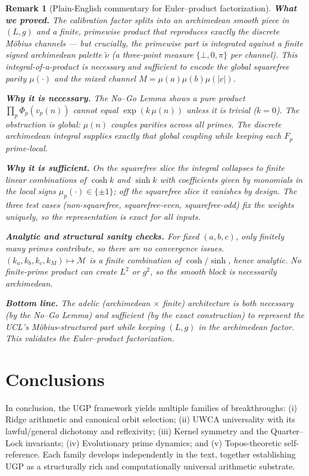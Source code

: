 \documentclass[12pt]{article}
\newtheorem*{remark*}{Remark}
\numberwithin{equation}{section}
\begin{document}
\begin{remark*}[Plain-English commentary for Euler–product factorization]
\textbf{What we proved.}
The calibration factor splits into an \emph{archimedean} smooth piece in $(L,g)$ and a \emph{finite, primewise} product that reproduces exactly the discrete Möbius channels — but crucially, the primewise part is integrated against a \emph{finite signed} archimedean palette $\tilde\nu$ (a three-point measure $\{\bot,0,\pi\}$ per channel). This integral-of-a-product is necessary and sufficient to encode the global squarefree parity $\mu(\cdot)$ and the mixed channel $M=\mu(a)\mu(b)\mu(|c|)$.

\textbf{Why it is necessary.}
The No–Go Lemma shows a pure product $\prod_p \Phi_p(v_p(n))$ cannot equal $\exp(k\,\mu(n))$ unless it is trivial ($k{=}0$). The obstruction is global: $\mu(n)$ couples parities across \emph{all} primes. The discrete archimedean integral supplies exactly that global coupling while keeping each $F_p$ prime-local.

\textbf{Why it is sufficient.}
On the squarefree slice the integral collapses to finite linear combinations of $\cosh k$ and $\sinh k$ with coefficients given by monomials in the local signs $\mu_p(\cdot)\in\{\pm1\}$; off the squarefree slice it vanishes by design. The three test cases (non-squarefree, squarefree-even, squarefree-odd) fix the weights uniquely, so the representation is exact for all inputs.

\textbf{Analytic and structural sanity checks.}
For fixed $(a,b,c)$, only finitely many primes contribute, so there are no convergence issues. $(k_a,k_b,k_c,k_M)\mapsto\mathcal{M}$ is a finite combination of $\cosh/\sinh$, hence analytic. No finite-prime product can create $L^2$ or $g^2$, so the smooth block is necessarily archimedean.

\textbf{Bottom line.}
The adelic (archimedean $\times$ finite) architecture is both \emph{necessary} (by the No–Go Lemma) and \emph{sufficient} (by the exact construction) to represent the UCL's Möbius-structured part while keeping $(L,g)$ in the archimedean factor. This validates the Euler–product factorization.
\end{remark*}


\section{Conclusions}
In conclusion, the UGP framework yields multiple families of breakthroughs: 
(i) Ridge arithmetic and canonical orbit selection; 
(ii) UWCA universality with its lawful/general dichotomy and reflexivity; 
(iii) Kernel symmetry and the Quarter--Lock invariants; 
(iv) Evolutionary prime dynamics; and 
(v) Topos-theoretic self-reference. 
Each family develops independently in the text, together establishing UGP as a structurally rich and computationally universal arithmetic substrate.
\end{document}
